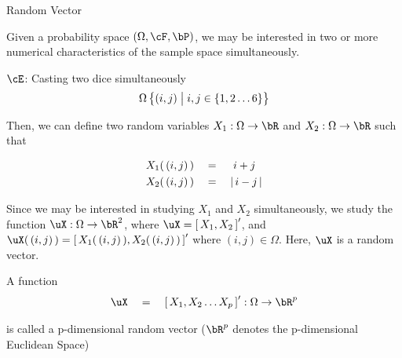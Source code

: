 \documentclass{article}
\begin{document}
\makeheader%

\begin{ssection}{Random Vector}

	Given a probability space $\para{\Omega, \cF, \bP}$, we may be interested in two or more numerical characteristics of the sample space simultaneously.

	\begin{example}
		$\cE$: Casting two dice simultaneously
		\begin{align*}
			\Omega	\left\{ {(i, j) \;\big|\; i, j \in \left\{ {1, 2 \dots 6} \right\}} \right\}
		\end{align*}

		Then, we can define two random variables $X_1 : \Omega \ra \bR$ and $X_2 : \Omega \ra \bR$ such that

		\begin{align*}
			X_1(\,\left( {i, j} \right)\,)	&\quad = \quad	\;i + j \\
			X_2(\,\left( {i, j} \right)\,)	&\quad = \quad	\left| \,{i - j}\, \right|
		\end{align*}

		Since we may be interested in studying $X_1$ and $X_2$ simultaneously, we study the function $\uX : \Omega \ra \bR^2$, where $\uX = \brac{X_1, X_2}'$, and $\uX(\qpara{i, j}) =  \brac{X_1(\qpara{i, j}), X_2(\qpara{i, j})}'$ where $(i, j) \in \Omega$. Here, $\uX$ is a random vector.
	\end{example}

	\begin{definition}
		A function
		\begin{align*}
			\uX	\eq	\brac{X_1, X_2 \dots X_p}' : \Omega \ra \bR^p
		\end{align*}

		is called a p-dimensional random vector ($\bR^p$ denotes the p-dimensional Euclidean Space)
	\end{definition}

\end{ssection}
\end{document}
